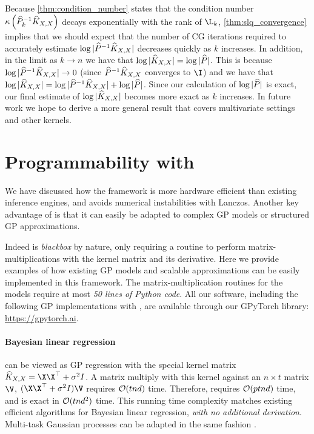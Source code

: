 Because \autoref{thm:condition_number} states that the condition number $\kappa \left( \widehat{P}_{k}^{-1}\widehat{K}_{X,X} \right)$ decays exponentially with the rank of $\L_{k}$, \autoref{thm:slq_convergence} implies that we should expect that the number of CG iterations required to accurately estimate $\log \vert \widehat{P}^{-1}\widehat{K}_{X,X} \vert$ decreases quickly as $k$ increases.
In addition, in the limit as $k \rightarrow n$ we have that $\log \vert \widehat{K}_{X,X} \vert = \log \vert \widehat{P} \vert$.
This is because $\log \vert \widehat{P}^{-1}\widehat{K}_{X,X} \vert \rightarrow 0$ (since $\widehat{P}^{-1}\widehat{K}_{X,X}$ converges to $\I$) and we have that $\log \vert \widehat{K}_{X,X} \vert = \log \vert \widehat{P}^{-1}\widehat{K}_{X,X} \vert + \log \vert \widehat{P} \vert$.
Since our calculation of $\log \vert \widehat{P} \vert$ is exact, our final estimate of $\log \vert \widehat{K}_{X,X} \vert$ becomes more exact as $k$ increases.
In future work we hope to derive a more general result that covers multivariate settings and other kernels.
%
\section{Programmability with \mmacro{}}
\label{sec:advantages}
We have discussed how the \mmacro{} framework is more hardware efficient than existing inference engines, and avoids numerical instabilities with Lanczos. Another key advantage of \mmacro{} is that it can easily be adapted to complex GP models or structured GP approximations.

Indeed \mmacro{} is \emph{blackbox} by nature, only requiring a routine to perform matrix-multiplications with the kernel matrix and its derivative.
Here we provide examples of how existing GP models and scalable approximations can be easily implemented in this framework.
The matrix-multiplication routines for the models require at most \emph{50 lines of Python code}.
All our software, including the following GP implementations with \mmacro{}, are available through our GPyTorch library: \\
\url{https://gpytorch.ai}.
%

\paragraph{Bayesian linear regression} can be viewed as GP regression with the special kernel matrix $\trainK = \X\X^{\top} + \sigma^{2}I$.
A matrix multiply with this kernel against an $n \times t$ matrix $\V$, $(\X\X^{\top} + \sigma^{2}I)\V$ requires $\bigo{tnd}$ time.
Therefore, \mmacro{} requires $\bigo{ptnd}$ time, and is exact in $\bigo{tnd^2}$ time.
This running time complexity matches existing efficient algorithms for Bayesian linear regression, \emph{with no additional derivation}.
Multi-task Gaussian processes \cite{bonilla2008multi} can be adapted in the same fashion \cite{gardner2018product}.

